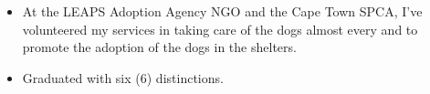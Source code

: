\documentclass[10pt,a4paper]{altacv}
\begin{document}
\divider


\begin{itemize}
\item At the LEAPS Adoption Agency NGO and the Cape Town SPCA, I’ve volunteered my services in
taking care of the dogs almost every and to promote the adoption of the dogs in the shelters.  

\end{itemize}

\divider




\divider

\begin{itemize}
\item Graduated with six (6) distinctions.
\end{itemize}

\divider

\end{document}
